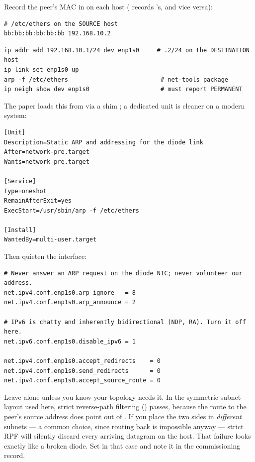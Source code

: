 \documentclass[11pt,a4paper]{article}
\begin{document}
Record the peer's MAC in  on each host (\srcside{} records
\dstside{}'s, and vice versa):

\begin{lstlisting}[style=conf]
# /etc/ethers on the SOURCE host
bb:bb:bb:bb:bb:bb 192.168.10.2
\end{lstlisting}

\begin{lstlisting}[style=shell]
ip addr add 192.168.10.1/24 dev enp1s0     # .2/24 on the DESTINATION host
ip link set enp1s0 up
arp -f /etc/ethers                          # net-tools package
ip neigh show dev enp1s0                    # must report PERMANENT
\end{lstlisting}

The paper loads this from  via a 
shim \cite{anton2024}; a dedicated unit is cleaner on a modern system:

\begin{lstlisting}[style=conf,caption={\file{/etc/systemd/system/diode-link.service}}]
[Unit]
Description=Static ARP and addressing for the diode link
After=network-pre.target
Wants=network-pre.target

[Service]
Type=oneshot
RemainAfterExit=yes
ExecStart=/usr/sbin/arp -f /etc/ethers

[Install]
WantedBy=multi-user.target
\end{lstlisting}

Then quieten the interface:

\begin{lstlisting}[style=conf,caption={\file{/etc/sysctl.d/90-diode.conf}}]
# Never answer an ARP request on the diode NIC; never volunteer our address.
net.ipv4.conf.enp1s0.arp_ignore   = 8
net.ipv4.conf.enp1s0.arp_announce = 2

# IPv6 is chatty and inherently bidirectional (NDP, RA). Turn it off here.
net.ipv6.conf.enp1s0.disable_ipv6 = 1

net.ipv4.conf.enp1s0.accept_redirects    = 0
net.ipv4.conf.enp1s0.send_redirects      = 0
net.ipv4.conf.enp1s0.accept_source_route = 0
\end{lstlisting}

\begin{warnbox}
Leave  alone unless you know your topology needs it. In the
symmetric-subnet layout used here, strict reverse-path filtering
() passes, because the route to the peer's source address
does point out of . If you place the two sides in \emph{different}
subnets --- a common choice, since routing back is impossible anyway --- strict
RPF will silently discard every arriving datagram on the \dstside{} host.
That failure looks exactly like a broken diode. Set
 in that case and note it in the
commissioning record.
\end{warnbox}
\end{document}
